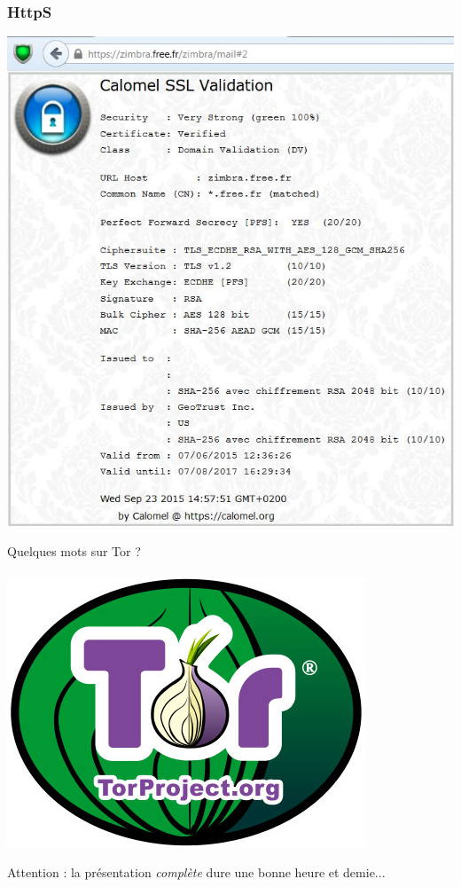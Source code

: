 \documentclass{beamer}
\begin{document}
\begin{frame}
\frametitle{HttpS}
\begin{center}
\includegraphics[scale=0.5] {./images/https.jpg}
\end{center}
\end{frame}

\begin{frame}
\begin{center}
\Huge{Quelques mots sur Tor ? }
\\~\\ \includegraphics[scale=0.4]{./images/logo_tor.jpg}
\end{center}
\huge{Attention : la présentation \emph{complète} dure une bonne heure et demie...}
\end{frame}
\end{document}
